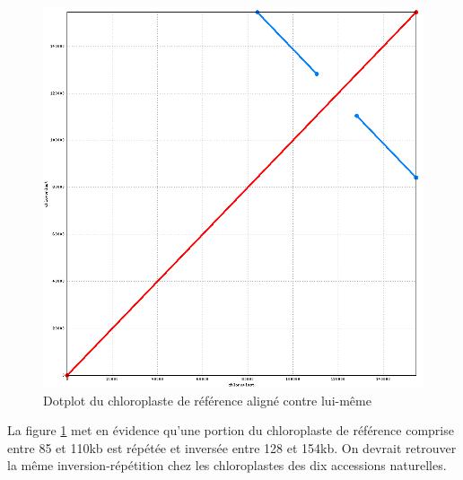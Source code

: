 \documentclass[a4paper]{article}
\begin{document}
\begin{figure}[!ht]
\centering
\includegraphics[scale=0.3] {Assemblage/chloroVSchloro.png}
\caption{Dotplot du chloroplaste de référence aligné contre lui-même}
\label{temoinchloro}
\end{figure}

La figure \ref{temoinchloro} met en évidence qu'une portion du chloroplaste de référence comprise entre 85 et 110kb est répétée et inversée entre 128 et 154kb. On devrait retrouver la même inversion-répétition chez les chloroplastes des dix accessions naturelles. 
\end{document}
